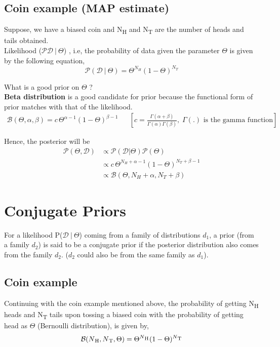 \documentclass{report}
\newcommand{\Pb}{\mathcal{P}}
\newcommand{\D}{\mathcal{D}}
\newcommand{\Beta}{\mathcal{B}}
\begin{document}
\subsection{Coin example (MAP estimate)}

Suppose, we have a biased coin and N\textsubscript{H} and N\textsubscript{T} are the number of heads and tails obtained.\\ Likelihood ($\Pb\D \ | \ \Theta$) , i.e, the probability of data given the parameter $\Theta$ is given by the following equation,
$$
  \Pb(\D \ | \ \Theta)=\Theta^{N_H}(1-\Theta)^{N_T}
$$

What is a good prior on $\Theta$ ? \\
\textbf{Beta distribution} is a good candidate for prior because the functional form of prior matches with that of the likelihood.
\begin{align*}
  \Beta(\Theta,\alpha,\beta) = c\,\Theta^{\alpha-1}(1-\Theta)^{\beta-1} &  & [c= \frac{\Gamma(\alpha + \beta)}{\Gamma(\alpha)\Gamma(\beta)},\; \Gamma(.) \text{ is the gamma function} ]
\end{align*}

Hence, the posterior will be
\begin{align*}
  \Pb(\Theta,\D) & \propto \Pb(\D | \Theta) \Pb(\Theta)                     \\
                 & \propto c\,\Theta^{N_H+\alpha-1}(1-\Theta)^{N_T+\beta-1} \\
                 & \propto \Beta(\Theta,N_H+\alpha,N_T+\beta)
\end{align*}

\section{Conjugate Priors}
For a likelihood P($\D \ | \ \Theta$) coming from a family of distributions $d_{1}$, a prior (from a family $d_{2}$) is said to be a conjugate prior if the posterior distribution also comes from the family $d_{2}$. ($d_{2}$ could also be from the same family as $d_{1}$).

\subsection{Coin example}
Continuing with the coin example mentioned above, the probability of getting N\textsubscript{H} heads and N\textsubscript{T} tails upon tossing a biased coin with the probability of getting head as $\Theta$ (Bernoulli distribution), is given by,
$$
  \Beta(N\textsubscript{H}, N\textsubscript{T}, \Theta) = \Theta^{N\textsubscript{H}}(1-\Theta)^{N\textsubscript{T}}
$$
\end{document}
